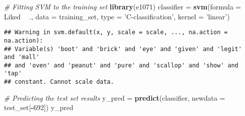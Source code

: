 \documentclass[]{article}
\newenvironment{Shaded}{\begin{snugshade}}{\end{snugshade}}
\newcommand{\CommentTok}[1]{\textcolor[rgb]{0.56,0.35,0.01}{\textit{#1}}}
\newcommand{\DataTypeTok}[1]{\textcolor[rgb]{0.13,0.29,0.53}{#1}}
\newcommand{\DecValTok}[1]{\textcolor[rgb]{0.00,0.00,0.81}{#1}}
\newcommand{\KeywordTok}[1]{\textcolor[rgb]{0.13,0.29,0.53}{\textbf{#1}}}
\newcommand{\NormalTok}[1]{#1}
\newcommand{\OperatorTok}[1]{\textcolor[rgb]{0.81,0.36,0.00}{\textbf{#1}}}
\newcommand{\StringTok}[1]{\textcolor[rgb]{0.31,0.60,0.02}{#1}}
\begin{document}
\begin{Shaded}
\begin{Highlighting}[]
\CommentTok{# Fitting SVM to the training set}
\KeywordTok{library}\NormalTok{(e1071)}
\NormalTok{classifier =}\StringTok{ }\KeywordTok{svm}\NormalTok{(}\DataTypeTok{formula =}\NormalTok{ Liked }\OperatorTok{~}\StringTok{ }\NormalTok{., }
                 \DataTypeTok{data =}\NormalTok{ training_set, }
                 \DataTypeTok{type =} \StringTok{'C-classification'}\NormalTok{, }
                 \DataTypeTok{kernel =} \StringTok{'linear'}\NormalTok{)}
\end{Highlighting}
\end{Shaded}

\begin{verbatim}
## Warning in svm.default(x, y, scale = scale, ..., na.action = na.action):
## Variable(s) 'boot' and 'brick' and 'eye' and 'given' and 'legit' and 'mall'
## and 'oven' and 'peanut' and 'pure' and 'scallop' and 'show' and 'tap'
## constant. Cannot scale data.
\end{verbatim}

\begin{Shaded}
\begin{Highlighting}[]
\CommentTok{# Predicting the test set results}
\NormalTok{y_pred =}\StringTok{ }\KeywordTok{predict}\NormalTok{(classifier, }\DataTypeTok{newdata =}\NormalTok{ test_set[}\OperatorTok{-}\DecValTok{692}\NormalTok{])}
\NormalTok{y_pred}
\end{Highlighting}
\end{Shaded}
\end{document}
